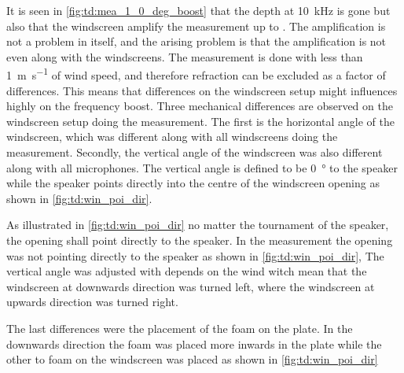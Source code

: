 
It is seen in \autoref{fig:td:mea_1_0_deg_boost} that the depth at \SI{10}{\kilo\hertz} is gone but also that the windscreen amplify the measurement up to . The amplification is not a problem in itself, and the arising problem is that the amplification is not even along with the windscreens. The measurement is done with less than \SI{1}{\meter\per\second} of wind speed, and therefore refraction can be excluded as a factor of differences. This means that differences on the windscreen setup might influences highly on the frequency boost. 
Three mechanical differences are observed on the windscreen setup doing the measurement. The first is the horizontal angle of the windscreen, which was different along with all windscreens doing the measurement. Secondly, the vertical angle of the windscreen was also different along with all microphones. The vertical angle is defined to be \SI{0}{\degree} to the speaker while the speaker points directly into the centre of the windscreen opening as shown in \autoref{fig:td:win_poi_dir}.


As illustrated in \autoref{fig:td:win_poi_dir} no matter the tournament of the speaker, the opening shall point directly to the speaker. In the measurement the opening was not pointing directly to the speaker as shown in \autoref{fig:td:win_poi_dir}, The vertical angle was adjusted with depends on the wind witch mean that the windscreen at downwards direction was turned left, where the windscreen at upwards direction was turned right. 

The last differences were the placement of the foam on the plate. In the downwards direction the foam was placed more inwards in the plate while the other to foam on the windscreen was placed as shown in \autoref{fig:td:win_poi_dir}


